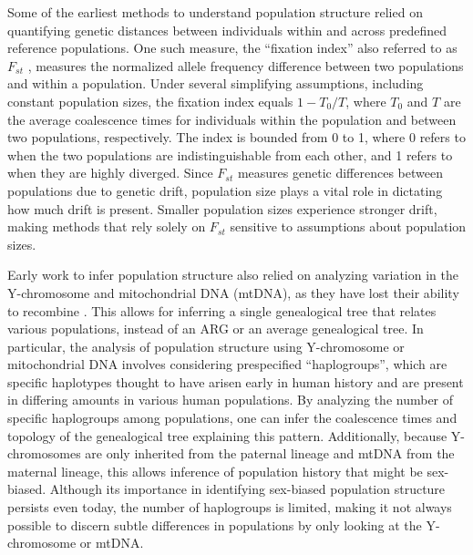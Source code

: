Some of the earliest methods to understand population structure relied on quantifying genetic distances between individuals within and across predefined reference populations. One such measure, the ``fixation index'' also referred to as \(F_{st}\) \cite{Wright1951, Malecot1948}, measures the normalized allele frequency difference between two populations and within a population. Under several simplifying assumptions, including constant population sizes, the fixation index equals \(1 - T_0/T\), where \(T_0\) and \(T\) are the average coalescence times for individuals within the population and between two populations, respectively. The index is bounded from 0 to 1, where 0 refers to when the two populations are indistinguishable from each other, and 1 refers to when they are highly diverged. Since \(F_{st}\) measures genetic differences between populations due to genetic drift, population size plays a vital role in dictating how much drift is present. Smaller population sizes experience stronger drift, making methods that rely solely on \(F_{st}\) sensitive to assumptions about population sizes.

Early work to infer population structure also relied on analyzing variation in the Y-chromosome and mitochondrial DNA (mtDNA), as they have lost their ability to recombine \cite{Cann1987, tilford2001physical}. This allows for inferring a single genealogical tree that relates various populations, instead of an ARG or an average genealogical tree. In particular, the analysis of population structure using Y-chromosome or mitochondrial DNA involves considering prespecified ``haplogroups'', which are specific haplotypes thought to have arisen early in human history and are present in differing amounts in various human populations. By analyzing the number of specific haplogroups among populations, one can infer the coalescence times and topology of the genealogical tree explaining this pattern. Additionally, because Y-chromosomes are only inherited from the paternal lineage and mtDNA from the maternal lineage, this allows inference of population history that might be sex-biased. Although its importance in identifying sex-biased population structure persists even today, the number of haplogroups is limited, making it not always possible to discern subtle differences in populations by only looking at the Y-chromosome or mtDNA.

